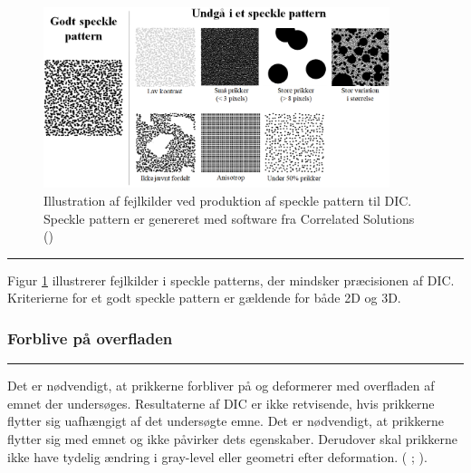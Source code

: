 \begin{figure}[H]
  \centering
    \includegraphics[width=0.9\textwidth]{Sections/2 Problemanalyse/Media/speckle pattern.png}
    \caption{Illustration af fejlkilder ved produktion af speckle pattern til DIC. Speckle pattern er genereret med software fra Correlated Solutions (\cite{CorrelatedSolutions2025SpeckleInc.})}
    \label{fig:godt speckle pattern}
\end{figure} \plainbreak{-0.4}

Figur \ref{fig:godt speckle pattern} illustrerer fejlkilder i speckle patterns, der mindsker præcisionen af DIC. Kriterierne for et godt speckle pattern er gældende for både 2D og 3D.


\subsubsection{Forblive på overfladen} \plainbreak{-0.4}
Det er nødvendigt, at prikkerne forbliver på og deformerer med overfladen af emnet der undersøges. Resultaterne af DIC er ikke retvisende, hvis prikkerne flytter sig uafhængigt af det undersøgte emne. Det er nødvendigt, at prikkerne flytter sig med emnet og ikke påvirker dets egenskaber. Derudover skal prikkerne ikke have tydelig ændring i gray-level eller geometri efter deformation.
(\cite{Dong2017ACorrelation} ; \cite{Zaya2023ApplicationReview}). \label{par:overfladen}

